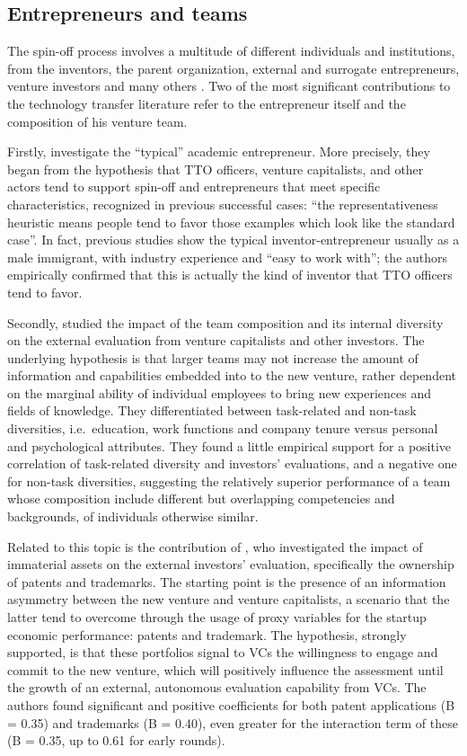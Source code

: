 \subsection{Entrepreneurs and teams}

The spin-off process involves a multitude of different individuals and institutions, from the inventors, the parent organization, external and surrogate entrepreneurs, venture investors and many others \citep{Djokovic2008}. Two of the most significant contributions to the technology transfer literature refer to the entrepreneur itself and the composition of his venture team.

Firstly, \citet{Shane2015} investigate the \enquote{typical} academic entrepreneur. More precisely, they began from the hypothesis that TTO officers, venture capitalists, and other actors tend to support spin-off and entrepreneurs that meet specific characteristics, recognized in previous successful cases: \enquote{the representativeness heuristic means people tend to favor those examples which look like the standard case}. In fact, previous studies show the typical inventor-entrepreneur usually as a male immigrant, with industry experience and \enquote{easy to work with}; the authors empirically confirmed that this is actually the kind of inventor that TTO officers tend to favor.

Secondly, \citet{DerFoo2005} studied the impact of the team composition and its internal diversity on the external evaluation from venture capitalists and other investors. The underlying hypothesis is that larger teams may not increase the amount of information and capabilities embedded into to the new venture, rather dependent on the marginal ability of individual employees to bring new experiences and fields of knowledge. They differentiated between task-related and non-task diversities, i.e.\ education, work functions and company tenure versus personal and psychological attributes. They found a little empirical support for a positive correlation of task-related diversity and investors' evaluations, and a negative one for non-task diversities, suggesting the relatively superior performance of a team whose composition include different but overlapping competencies and backgrounds, of individuals otherwise similar.

Related to this topic is the contribution of \citet{Zhou2014}, who investigated the impact of immaterial assets on the external investors' evaluation, specifically the ownership of patents and trademarks. The starting point is the presence of an information asymmetry between the new venture and venture capitalists, a scenario that the latter tend to overcome through the usage of proxy variables for the startup economic performance: patents and trademark. The hypothesis, strongly supported, is that these portfolios signal to VCs the willingness to engage and commit to the new venture, which will positively influence the assessment until the growth of an external, autonomous evaluation capability from VCs. The authors found significant and positive coefficients for both patent applications (B = 0.35) and trademarks (B = 0.40), even greater for the interaction term of these (B = 0.35, up to 0.61 for early rounds).

